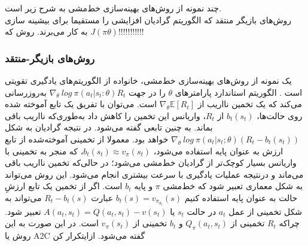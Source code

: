 چند نمونه از روش‌های بهینه‌سازی خط‌مشی به شرح زیر است. \\
روش‌های بازیگر منتقد
  که الگوریتم 
 گرادیان افزایشی
   را مستقیما برای بیشینه سازی 
$J(\pi\theta)$
به کار می‌برند.
روش  
 که!!!!!!!!!!!

\subsubsection{روش‌های بازیگر-منتقد}
یک نمونه از روش‌های بهینه‌سازی خط‌مشی، خانواده
 از الگوریتم‌های یادگیری تقویتی است
\cite{williams1992simple}.
الگوریتم استاندارد  پارامترهای $\theta$ را در جهت 
 $\nabla_\theta \  log  \ \pi (a_t|s_t:\theta)R_t$ به‌روزرسانی می‌کند که یک تخمین نااریب از
   $\nabla_\theta \mathbb{E}[R_t]$
است. می‌توان با تفریق یک تابع آموخته شده روی حالت‌ها، 
$b_t(s_t)$
از 
$R_t$،
 واریانس این تخمین را کاهش داد به‌طوری‌که نااریب باقی بماند. به چنین تابعی  گفته می‌شود. 
 در نتیجه گرادیان به شکل
$\nabla_\theta \ log \ \pi(a_t|s_t;\theta) (R_t - b_t(s_t))$
خواهد بود. معمولا از تخمینی آموخته‌شده از تابع ارزش به عنوان پایه استفاده می‌شود،
$b_t(s_t) \approx v_\pi (s_t)$،
 که منجر به تخمینی با واریانس بسیار کوچک‌تر از گرادیان خط‌مشی می‌‌شود؛ در حالی‌که تخمین نااریب باقی می‌ماند و درنتیجه عملیات یادگیری با سرعت بیشتری انجام می‌شود.
این روش می‌تواند به شکل معماری   تعبیر شود که خط‌مشی $\pi$  و پایه $b_t$  است. اگر از تخمین یک تابع ارزشِ حالت به عنوان پایه استفاده کنیم 
$b_t(s) = v_{\pi_{\theta_t}}(s)$ عبارت $R_t - b_t(s)$ می‌تواند به شکل تخمینی از   عمل $a_t$ در حالت $s_t$ یا 
$A(a_t,s_t)=Q(a_t,s_t)-v(s_t)$ تعبیر شود. چراکه $R_t$ تخمینی از  $Q_\pi (a_t, s_t)$ و $b_t$ تخمینی از  $v_\pi (s_t)$ است. در این صورت به این روش 
 یا A2C گفته می‌شود.
‌ازای{تکرار کن}


